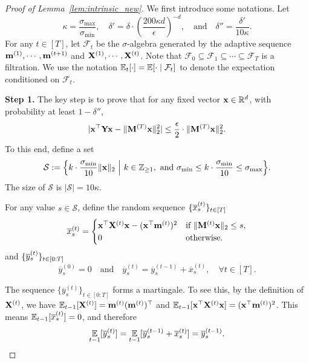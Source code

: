 \begin{proof}[Proof of Lemma~\ref{lem:intrinsic_new}]
We first introduce some notations. 
Let 
\[
\kappa = \frac{\sigma_{\max}}{\sigma_{\min}}, \quad \delta' = \delta \cdot \left(\frac{200 \kappa d}{\epsilon}\right)^{-d}, \quad \text{and} \quad \delta'' = \frac{\delta'}{10 \kappa}.
\]
For any $t \in [T]$, let $\mathcal{F}_{t}$ be the $\sigma$-algebra generated by the adaptive sequence $\mathbf{m}^{(1)}, \cdots, \mathbf{m}^{(t+1)}$ and $\mathbf{X}^{(1)}, \cdots, \mathbf{X}^{(t)}$. Note that $\mathcal{F}_0 \subseteq \mathcal{F}_1 \subseteq \cdots \subseteq \mathcal{F}_T$ is a filtration. We use the notation $\operatorname*{{\mathbb{E}}}_{t}[\cdot] = \operatorname*{{\mathbb{E}}}[\cdot \mid \mathcal{F}_t]$ to denote the expectation conditioned on $\mathcal{F}_t$.


\vspace{+2mm}
{\bf Step 1.} The key step is to prove that for any fixed vector $\mathbf{x} \in \mathbb{R}^d$, with probability at least $1 - \delta''$, 
\begin{align}
|\mathbf{x}^{\top} \mathbf{Y} \mathbf{x} - \|\mathbf{M}^{(T)} \mathbf{x}\|_2^2 | \leq \frac{\epsilon}{2} \cdot \|\mathbf{M}^{(T)}\mathbf{x}\|_2^2.\label{eq:upper-goal1} 
\end{align}
To this end, define a set 
\[
\mathcal{S} := \Big\{k \cdot \frac{\sigma_{\min}}{10} \|\mathbf{x}\|_2 ~\Big|~ k \in \mathbb{Z}_{\geq 1}, \text{ and } \sigma_{\min} \leq k \cdot \frac{\sigma_{\min}}{10} \leq \sigma_{\max}\Big\}.
\]
The size of $\mathcal{S}$ is $|\mathcal{S}| = 10 \kappa$. 

For any value $s \in \mathcal{S}$, define the random sequence $\{\overline{x}_{s}^{(t)}\}_{t\in [T]}$
\begin{align}
\overline{x}_s^{(t)} =
\begin{cases}
\mathbf{x}^{\top} \mathbf{X}^{(t)} \mathbf{x} - (\mathbf{x}^{\top} \mathbf{m}^{(t)})^2 & \text{if } \|\mathbf{M}^{(t)} \mathbf{x}\|_2 \leq s, \\
0 & \text{otherwise.}
\end{cases} \label{eq:definition-ox}
\end{align}
and  $\{\overline{y}_{s}^{(t)}\}_{t\in [0:T]}$
\[
\overline{y}_s^{(0)} = 0\quad \text{and} \quad \overline{y}_s^{(t)} = \overline{y}_s^{(t-1)} + \overline{x}_s^{(t)},\quad \forall t \in [T].
\]

The sequence $\{\overline{y}_s^{(t)}\}_{t\in [0:T]}$ forms a martingale. To see this, by the definition of $\mathbf{X}^{(t)}$, we have $\operatorname*{{\mathbb{E}}}_{t-1}[\mathbf{X}^{(t)}] = \mathbf{m}^{(t)} (\mathbf{m}^{(t)})^{\top}$ and $\operatorname*{{\mathbb{E}}}_{t-1}[\mathbf{x}^{\top} \mathbf{X}^{(t)} \mathbf{x}] = (\mathbf{x}^{\top} \mathbf{m}^{(t)})^2$. This means $\operatorname*{{\mathbb{E}}}_{t-1}[\overline{x}_s^{(t)}] = 0$, and therefore
\[
\operatorname*{{\mathbb{E}}}_{t-1}[\overline{y}_s^{(t)}] = \operatorname*{{\mathbb{E}}}_{t-1}[\overline{y}_s^{(t-1)} + \overline{x}_s^{(t)}] = \overline{y}_s^{(t-1)}.
\]


\end{proof}
